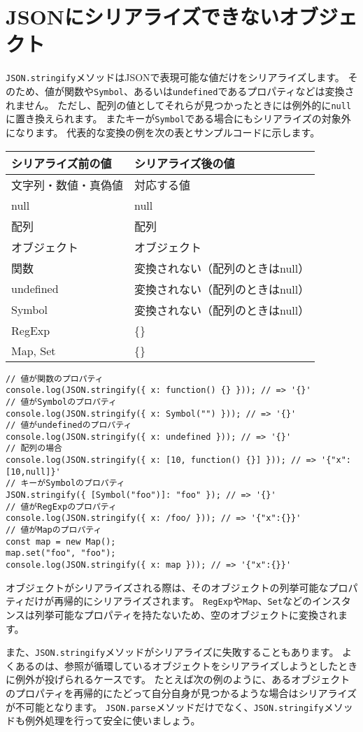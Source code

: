 \hypertarget{not-serialization-object}{%
\section{JSONにシリアライズできないオブジェクト}\label{not-serialization-object}}

\texttt{JSON.stringify}メソッドはJSONで表現可能な値だけをシリアライズします。
そのため、値が関数や\texttt{Symbol}、あるいは\texttt{undefined}であるプロパティなどは変換されません。
ただし、配列の値としてそれらが見つかったときには例外的に\texttt{null}に置き換えられます。
またキーが\texttt{Symbol}である場合にもシリアライズの対象外になります。
代表的な変換の例を次の表とサンプルコードに示します。

\begin{longtable}[]{@{}ll@{}}
\toprule
シリアライズ前の値 & シリアライズ後の値\tabularnewline
\midrule
\endhead
文字列・数値・真偽値 & 対応する値\tabularnewline
null & null\tabularnewline
配列 & 配列\tabularnewline
オブジェクト & オブジェクト\tabularnewline
関数 & 変換されない（配列のときはnull）\tabularnewline
undefined & 変換されない（配列のときはnull）\tabularnewline
Symbol & 変換されない（配列のときはnull）\tabularnewline
RegExp & \{\}\tabularnewline
Map, Set & \{\}\tabularnewline
\bottomrule
\end{longtable}

\begin{lstlisting}
// 値が関数のプロパティ
console.log(JSON.stringify({ x: function() {} })); // => '{}'
// 値がSymbolのプロパティ
console.log(JSON.stringify({ x: Symbol("") })); // => '{}'
// 値がundefinedのプロパティ
console.log(JSON.stringify({ x: undefined })); // => '{}'
// 配列の場合
console.log(JSON.stringify({ x: [10, function() {}] })); // => '{"x":[10,null]}'
// キーがSymbolのプロパティ
JSON.stringify({ [Symbol("foo")]: "foo" }); // => '{}'
// 値がRegExpのプロパティ
console.log(JSON.stringify({ x: /foo/ })); // => '{"x":{}}'
// 値がMapのプロパティ
const map = new Map();
map.set("foo", "foo");
console.log(JSON.stringify({ x: map })); // => '{"x":{}}'
\end{lstlisting}

オブジェクトがシリアライズされる際は、そのオブジェクトの列挙可能なプロパティだけが再帰的にシリアライズされます。
\texttt{RegExp}や\texttt{Map}、\texttt{Set}などのインスタンスは列挙可能なプロパティを持たないため、空のオブジェクトに変換されます。

また、\texttt{JSON.stringify}メソッドがシリアライズに失敗することもあります。
よくあるのは、参照が循環しているオブジェクトをシリアライズしようとしたときに例外が投げられるケースです。
たとえば次の例のように、あるオブジェクトのプロパティを再帰的にたどって自分自身が見つかるような場合はシリアライズが不可能となります。
\texttt{JSON.parse}メソッドだけでなく、\texttt{JSON.stringify}メソッドも例外処理を行って安全に使いましょう。

